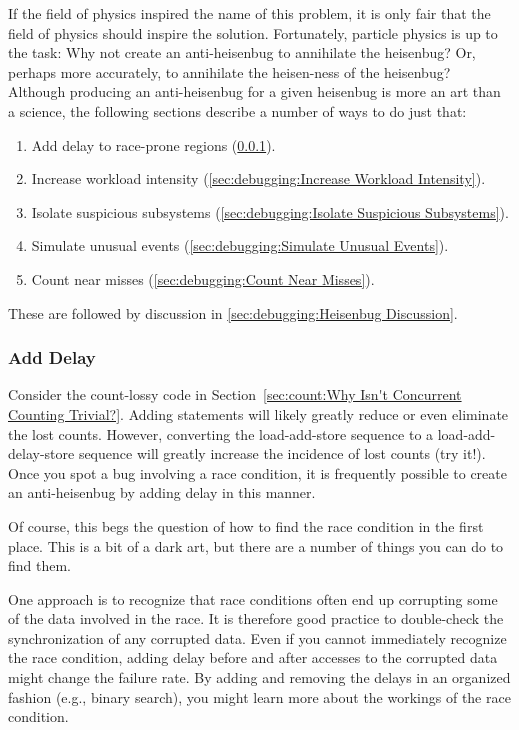 If the field of physics inspired the name of this problem, it is only
fair that the field of physics should inspire the solution.
Fortunately, particle physics is up to the task:
Why not create an anti-heisenbug to annihilate the heisenbug?
Or, perhaps more accurately, to annihilate the heisen-ness of
the heisenbug?
Although producing an anti-heisenbug for a given heisenbug is more an
art than a science, the following sections describe a number of ways to
do just that:

\begin{enumerate}
\item	Add delay to race-prone regions (\cref{sec:debugging:Add Delay}).
\item	Increase workload intensity
	(\cref{sec:debugging:Increase Workload Intensity}).
\item	Isolate suspicious subsystems
	(\cref{sec:debugging:Isolate Suspicious Subsystems}).
\item	Simulate unusual events (\cref{sec:debugging:Simulate Unusual Events}).
\item	Count near misses (\cref{sec:debugging:Count Near Misses}).
\end{enumerate}

These are followed by discussion in
\cref{sec:debugging:Heisenbug Discussion}.

\subsubsection{Add Delay}
\label{sec:debugging:Add Delay}

Consider the count-lossy code in
Section~\ref{sec:count:Why Isn't Concurrent Counting Trivial?}.
Adding  statements will likely greatly reduce or even
eliminate the lost counts.
However, converting the load-add-store sequence to a load-add-delay-store
sequence will greatly increase the incidence of lost counts (try it!).
Once you spot a bug involving a race condition, it is frequently possible
to create an anti-heisenbug by adding delay in this manner.

Of course, this begs the question of how to find the race condition in
the first place.
This is a bit of a dark art, but there are a number of things you can
do to find them.

One approach is to recognize that race conditions often end up corrupting
some of the data involved in the race.
It is therefore good practice to double-check the synchronization of
any corrupted data.
Even if you cannot immediately recognize the race condition, adding
delay before and after accesses to the corrupted data might change
the failure rate.
By adding and removing the delays in an organized fashion (e.g., binary
search), you might learn more about the workings of the race condition.

